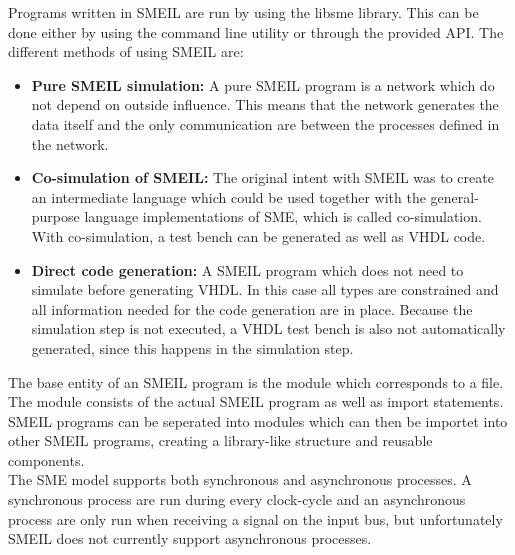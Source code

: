 Programs written in SMEIL are run by using the libsme library. This can be done either by using the command line utility or through the provided API.
The different methods of using SMEIL are:\\
\begin{itemize}
    \item \textbf{Pure SMEIL simulation:} A pure SMEIL program is a network which do not depend on outside influence. This means that the network  generates the data itself and the only communication are between the processes defined in the network.
    \item \textbf{Co-simulation of SMEIL:} The original intent with SMEIL was to create an intermediate language which could be used together with the general-purpose language implementations of SME, which is called co-simulation. With co-simulation, a test bench can be generated as well as VHDL code.
    \item \textbf{Direct code generation:} A SMEIL program which does not need to simulate before generating VHDL. In this case all types are constrained and all information needed for the code generation are in place. Because the simulation step is not executed, a VHDL test bench is also not automatically generated, since this happens in the simulation step.
\end{itemize}
The base entity of an SMEIL program is the module which corresponds to a file. The module consists of the actual SMEIL program as well as import statements. SMEIL programs can be seperated into modules which can then be importet into other SMEIL programs, creating a library-like structure and reusable components.\\

The SME model supports both synchronous and asynchronous processes. A synchronous process are run during every clock-cycle and an asynchronous process are only run when receiving a signal on the input bus, but unfortunately SMEIL does not currently support asynchronous processes. %
\\


